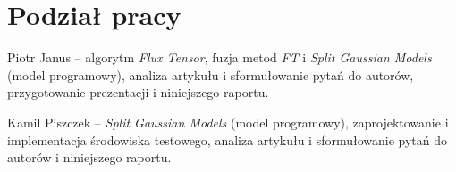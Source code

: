 \documentclass[10pt,a4paper]{article}
\begin{document}
\section{Podział pracy}

Piotr Janus -- algorytm \textit{Flux Tensor}, fuzja metod \textit{FT} i \textit{Split Gaussian Models} (model programowy), analiza artykułu i sformułowanie pytań do autorów, przygotowanie prezentacji i niniejszego raportu.

Kamil Piszczek --  \textit{Split Gaussian Models} (model programowy), zaprojektowanie i implementacja środowiska testowego,  analiza artykułu i sformułowanie pytań do autorów i niniejszego raportu. 
\end{document}
